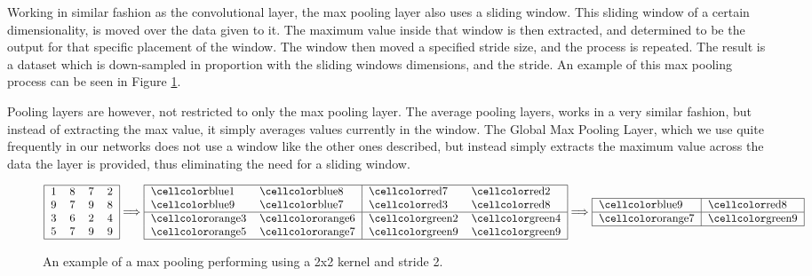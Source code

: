 \begin{description}
        Working in similar fashion as the convolutional layer, the max pooling
        layer also uses a sliding window. This sliding window of a certain
        dimensionality, is moved over the data given to it. The maximum value
        inside that window is then extracted, and determined to be the output
        for that specific placement of the window. The window then moved a
        specified stride size, and the process is repeated. The result is a
        dataset which is down-sampled in proportion with the sliding windows
        dimensions, and the stride. An example of this max pooling process can
        be seen in Figure \ref{fig:max_pool}.

        Pooling layers are however, not restricted to only the max pooling
        layer. The average pooling layers, works in a very similar fashion,
        but instead of extracting the max value, it simply averages values
        currently in the window. The Global Max Pooling Layer, which we use
        quite frequently in our networks does not use a window like the other
        ones described, but instead simply extracts the maximum value across
        the data the layer is provided, thus eliminating the need for a sliding
        window.

        \begin{figure}
        \centering
        \begin{equation}
            \begin{tabular}{|llll|}
            \hline
            1 & 8 & 7 & 2 \\
            9 & 7 & 9 & 8 \\
            3 & 6 & 2 & 4 \\
            5 & 7 & 9 & 9 \\\hline
            \end{tabular}
                \Longrightarrow
            \begin{tabular}{|ll|ll|}
            \hline
            \cc{blue}1 & \cc{blue}8 & \cc{red}7 & \cc{red}2 \\
            \cc{blue}9 & \cc{blue}7 & \cc{red}3 & \cc{red}8 \\ \hline
            \cc{orange}3 & \cc{orange}6 & \cc{green}2 & \cc{green}4 \\
            \cc{orange}5 & \cc{orange}7 & \cc{green}9 & \cc{green}9\\
            \hline
            \end{tabular}
                \Longrightarrow
            \begin{tabular}{|l|l|}
            \hline
            \cc{blue}9 & \cc{red}8\\\hline
            \cc{orange}7 & \cc{green}9\\
            \hline
            \end{tabular}
        \end{equation}
        \caption{An example of a max pooling performing using a 2x2 kernel and
            stride 2.}
        \label{fig:max_pool}
        \end{figure}



\end{description}

